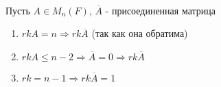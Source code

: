 \bigskip

\begin{problem}~

  Пусть $A \in M_n(F)$, $\overline{A}$ - присоединенная матрица

  \begin{enumerate}
    \item $rkA = n \Rightarrow rk\overline{A}$ (так как она обратима)
    \item $rkA \leq n - 2 \Rightarrow \overline{A} = 0 \Rightarrow rk \overline{A}$
    \item $rk = n - 1 \Rightarrow rk \overline{A} = 1$
  \end{enumerate}

\end{problem}

